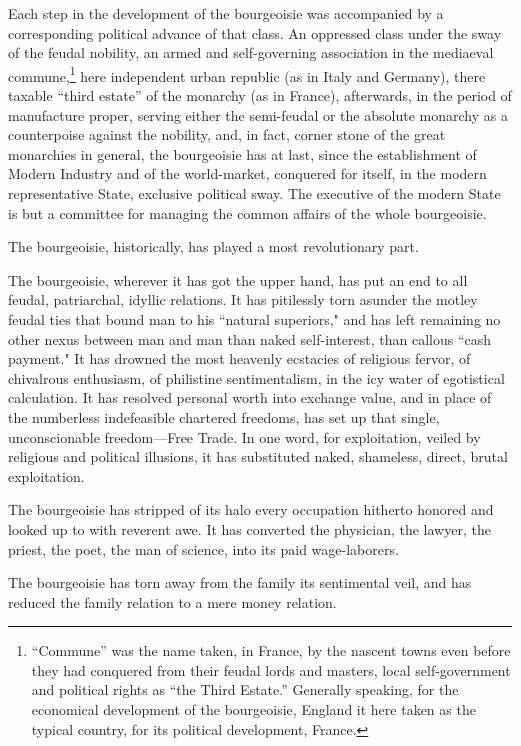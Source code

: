 Each step in the development of the bourgeoisie was accompanied by a corresponding political advance of that class. An oppressed class under the sway of the feudal nobility, an armed and self-governing association in the mediaeval commune,\footnote{``Commune'' was the name taken, in France, by the nascent towns even before they had conquered from their feudal lords and masters, local self-government and political rights as ``the Third Estate.'' Generally speaking, for the economical development of the bourgeoisie, England it here taken as the typical country, for its political development, France.} here independent urban republic (as in Italy and Germany), there taxable ``third estate'' of the monarchy (as in France), afterwards, in the period of manufacture proper, serving either the semi-feudal or the absolute monarchy as a counterpoise against the nobility, and, in fact, corner stone of the great monarchies in general, the bourgeoisie has at last, since the establishment of Modern Industry and of the world-market, conquered for itself, in the modern representative State, exclusive political sway. The executive of the modern State is but a committee for managing the common affairs of the whole bourgeoisie.

The bourgeoisie, historically, has played a most revolutionary part.

The bourgeoisie, wherever it has got the upper hand, has put an end to all feudal, patriarchal, idyllic relations. It has pitilessly torn asunder the motley feudal ties that bound man to his ``natural superiors," and has left remaining no other nexus between man and man than naked self-interest, than callous ``cash payment." It has drowned the most heavenly ecstacies of religious fervor, of chivalrous enthusiasm, of philistine sentimentalism, in the icy water of egotistical calculation. It has resolved personal worth into exchange value, and in place of the numberless indefeasible chartered freedoms, has set up that single, unconscionable freedom—Free Trade. In one word, for exploitation, veiled by religious and political illusions, it has substituted naked, shameless, direct, brutal exploitation.

The bourgeoisie has stripped of its halo every occupation hitherto honored and looked up to with reverent awe. It has converted the physician, the lawyer, the priest, the poet, the man of science, into its paid wage-laborers.

The bourgeoisie has torn away from the family its sentimental veil, and has reduced the family relation to a mere money relation.

